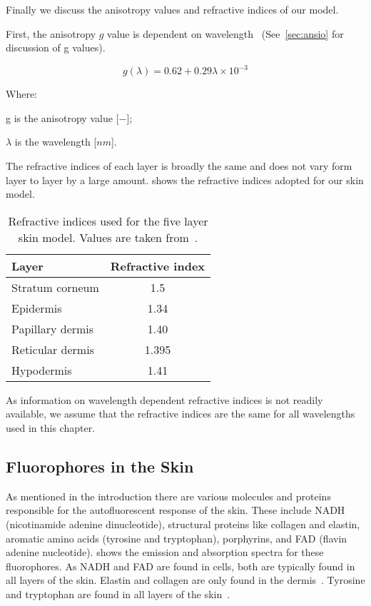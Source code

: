 Finally we discuss the anisotropy values and refractive indices of our model.

First, the anisotropy $g$ value is dependent on wavelength~\cite{louisethesis,van1989skin} (See~\cref{sec:ansio} for discussion of g values).

\begin{equation}
g(\lambda)=0.62+0.29\lambda\times10^{-3}
\end{equation}

\noindent Where:

\indent g is the anisotropy value [$-$];

\indent $\lambda$ is the wavelength [$nm$].

\medskip

The refractive indices of each layer is broadly the same and does not vary form layer to layer by a large amount.
 shows the refractive indices adopted for our skin model.

\begin{table}[!htpb]
  \centering

  \begin{tabular}{l|c}
  \hline
  Layer & Refractive index \\
  \hline
    Stratum corneum & 1.5 \\
    Epidermis &  1.34\\
    Papillary dermis & 1.40 \\
    Reticular dermis &  1.395\\
    Hypodermis &  1.41\\

  \hline
  \end{tabular}
    \caption{Refractive indices used for the five layer skin model. Values are taken from~\cite{meglinski2002quantitative}.}
  \label{tab:refindex}
\end{table}

As information on wavelength dependent refractive indices is not readily available, we assume that the refractive indices are the same for all wavelengths used in this chapter.

\subsection{Fluorophores in the Skin}

As mentioned in the introduction there are various molecules and proteins responsible for the autofluorescent response of the skin.
These include NADH (nicotinamide adenine dinucleotide), structural proteins like collagen and elastin, aromatic amino acids (tyrosine and tryptophan), porphyrins, and FAD (flavin adenine nucleotide).
 shows the emission and absorption spectra for these fluorophores.
As NADH and FAD are found in cells, both are typically found in all layers of the skin.
Elastin and collagen are only found in the dermis~\cite{gillies2000fluorescence}.
Tyrosine and tryptophan are found in all layers of the skin~\cite{gillies2000fluorescence}.

